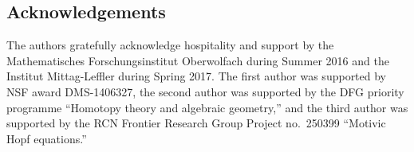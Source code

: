 \documentclass[10pt]{amsart}
\numberwithin{equation}{section}
\theoremstyle{plain}
\theoremstyle{definition}
\theoremstyle{remark}
\begin{document}
\subsection*{Acknowledgements}
The authors gratefully acknowledge hospitality and support by the Mathematisches Forschungsinstitut Oberwolfach during Summer 2016 and the 
Institut Mittag-Leffler during Spring 2017. The first author was supported by NSF award DMS-1406327, the second author was supported by
the DFG priority programme ``Homotopy theory and algebraic geometry,''
and the third author was supported by the RCN 
Frontier Research Group Project no.~250399
``Motivic Hopf equations.''



\end{document}

